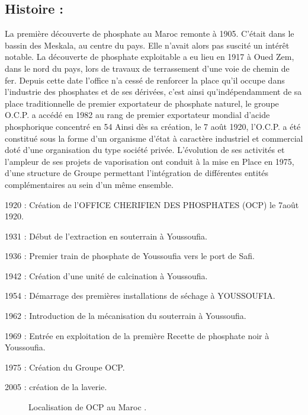 \documentclass[a4paper,12pt]{report}
\begin{document}
\subsection{Histoire :}
La première découverte de phosphate au Maroc remonte à 1905. C’était dans le bassin des Meskala, au centre du pays. Elle n’avait alors pas suscité un intérêt notable. La découverte de phosphate exploitable a eu lieu en 1917 à Oued Zem, dans le nord du pays, lors de travaux de terrassement d’une voie de chemin de fer.
Depuis cette date l’office n’a cessé de renforcer la place qu’il occupe dans l’industrie des phosphates et de ses dérivées, c’est ainsi qu’indépendamment de sa place traditionnelle de premier exportateur de phosphate naturel, le groupe O.C.P. a accédé en 1982 au rang de premier exportateur mondial d’acide phosphorique concentré en 54 %
Ainsi dès sa création, le 7 août 1920, l’O.C.P. a été constitué sous la forme d’un organisme d’état à caractère industriel et commercial doté d’une organisation du type société privée. L’évolution de ses activités et l’ampleur de ses projets de vaporisation ont conduit à la mise en Place en 1975, d’une structure de Groupe permettant l’intégration de différentes entités complémentaires au sein d’un même ensemble.

1920 : Création de l'OFFICE CHERIFIEN DES PHOSPHATES (OCP) le 7août 1920.

1931 : Début de l’extraction en souterrain à Youssoufia.

1936 : Premier train de phosphate de Youssoufia vers le port de Safi.

1942 : Création d'une unité de calcination à Youssoufia.

1954 : Démarrage des premières installations de séchage à YOUSSOUFIA. 

1962 : Introduction de la mécanisation du souterrain à Youssoufia.

1969 : Entrée en exploitation de la première Recette de phosphate noir à Youssoufia.

1975 : Création du Groupe OCP.

2005 : création de la laverie.
\begin{figure}[h]
    \centering
    \caption{Localisation de OCP au Maroc .}
    \label{fig:mon_image}
\end{figure}
\end{document}
